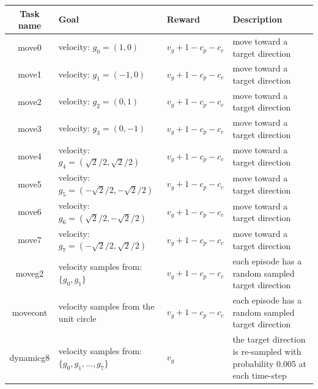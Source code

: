 \begin{table}[!htbp]

\begin{center}
\begin{tabular}{|c|p{3cm}|p{4cm}|p{4cm}|}
\hline
Task name & Goal & Reward  &  Description \\
\hline\hline
move0 & velocity: $g_0=(1,0)$ &$ v_g+1-c_p-c_c$  & move toward a target direction \\
\hline
move1 & velocity: $g_1=(-1,0)$ &$ v_g+1-c_p-c_c$  & move toward a target direction\\
\hline
move2 & velocity: $g_2=(0,1)$ &$ v_g+1-c_p-c_c$  & move toward a target direction \\
\hline
move3 & velocity: $g_3=(0,-1)$ &$ v_g+1-c_p-c_c$  & move toward a target direction \\ 
\hline 
move4 & velocity: $g_4=(\sqrt{2}/2,\sqrt{2}/2)$ &$ v_g+1-c_p-c_c$  & move toward a target direction \\ 
\hline 
move5 & velocity: $g_5=(-\sqrt{2}/2,-\sqrt{2}/2)$ &$ v_g+1-c_p-c_c$  & move toward a target direction \\ 
\hline 
move6 & velocity: $g_6=(\sqrt{2}/2,-\sqrt{2}/2)$ &$ v_g+1-c_p-c_c$  & move toward a target direction \\ 
\hline 
move7 & velocity: $g_7=(-\sqrt{2}/2,\sqrt{2}/2)$ &$ v_g+1-c_p-c_c$  & move toward a target direction \\ 
\hline 
moveg2 & velocity samples from: $\{g_0,g_1\}$ &$ v_g+1-c_p-c_c$  & each episode has a random sampled target direction \\ \hline
movecont & velocity samples from the unit circle&$ v_g+1-c_p-c_c$  & each episode has a random sampled target direction \\ \hline
dynamicg8 &  velocity samples from: $\{g_0,g_1, \dots,g_7\}$ &$ v_g$  & the target direction is re-sampled with probability 0.005 at each time-step  \\ \hline

\end{tabular}
\end{center}
\end{table}
